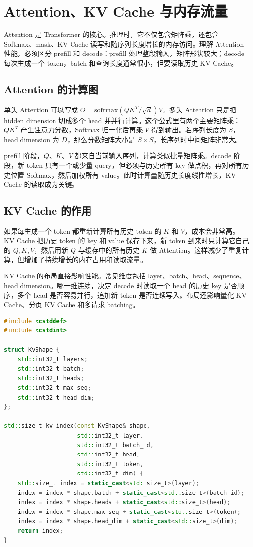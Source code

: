 \chapter{Attention、KV Cache 与内存流量}

Attention 是 Transformer 的核心。推理时，它不仅包含矩阵乘，还包含 Softmax、mask、KV Cache 读写和随序列长度增长的内存访问。理解 Attention 性能，必须区分 prefill 和 decode：prefill 处理整段输入，矩阵形状较大；decode 每次生成一个 token，batch 和查询长度通常很小，但要读取历史 KV Cache。

\section{Attention 的计算图}

单头 Attention 可以写成 $O=\mathrm{softmax}(QK^T / \sqrt{d})V$。多头 Attention 只是把 hidden dimension 切成多个 head 并并行计算。这个公式里有两个主要矩阵乘：$QK^T$ 产生注意力分数，Softmax 归一化后再乘 $V$ 得到输出。若序列长度为 $S$，head dimension 为 $D$，那么分数矩阵大小是 $S \times S$，长序列时中间矩阵非常大。

prefill 阶段，$Q$、$K$、$V$ 都来自当前输入序列，计算类似批量矩阵乘。decode 阶段，新 token 只有一个或少量 query，但必须与历史所有 key 做点积，再对所有历史位置 Softmax，然后加权所有 value。此时计算量随历史长度线性增长，KV Cache 的读取成为关键。

\section{KV Cache 的作用}

如果每生成一个 token 都重新计算所有历史 token 的 $K$ 和 $V$，成本会非常高。KV Cache 把历史 token 的 key 和 value 保存下来，新 token 到来时只计算它自己的 $Q,K,V$，然后用新 $Q$ 与缓存中的所有历史 $K$ 做 Attention。这样减少了重复计算，但增加了持续增长的内存占用和读取流量。

KV Cache 的布局直接影响性能。常见维度包括 layer、batch、head、sequence、head dimension。哪一维连续，决定 decode 时读取一个 head 的历史 key 是否顺序，多个 head 是否容易并行，追加新 token 是否连续写入。布局还影响量化 KV Cache、分页 KV Cache 和多请求 batching。

\begin{lstlisting}[language=C++,caption={教学版 KV Cache 索引：明确每个维度的地址贡献}]
#include <cstddef>
#include <cstdint>

struct KvShape {
    std::int32_t layers;
    std::int32_t batch;
    std::int32_t heads;
    std::int32_t max_seq;
    std::int32_t head_dim;
};

std::size_t kv_index(const KvShape& shape,
                     std::int32_t layer,
                     std::int32_t batch_id,
                     std::int32_t head,
                     std::int32_t token,
                     std::int32_t dim) {
    std::size_t index = static_cast<std::size_t>(layer);
    index = index * shape.batch + static_cast<std::size_t>(batch_id);
    index = index * shape.heads + static_cast<std::size_t>(head);
    index = index * shape.max_seq + static_cast<std::size_t>(token);
    index = index * shape.head_dim + static_cast<std::size_t>(dim);
    return index;
}
\end{lstlisting}

